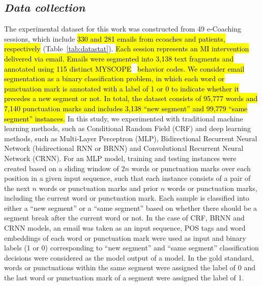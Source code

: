 \documentclass{amia}
\begin{document}
\subsection*{\textit{Data collection}}
The experimental dataset for this work was constructed from 49 e-Coaching sessions, which include \hl{330 and 281 emails from ecoaches and patients, respectively }(Table~\ref{tab:datastat}). \hl{Each session represents an MI intervention delivered via email. Emails were segmented into 3,138 text fragments and annotated using 115 distinct MYSCOPE}~\cite{carcone2013provider} \hl{behavior codes. We consider email segmentation as a binary classification problem, in which each word or punctuation mark is annotated with a label of 1 or 0 to indicate whether it precedes a new segment or not. In total, the dataset consists of 95,777 words and 7,140 punctuation marks and includes 3,138 ``new segment'' and 99,779 ``same segment'' instances.} In this study, we experimented with traditional machine learning methods, such as Conditional Random Field (CRF)\cite{lafferty2001conditional} and deep learning methods, such as Multi-Layer Perceptron (MLP),\cite{rumelhart1986learning} Bidirectional Recurrent Neural Network (bidirectional RNN or BRNN)\cite{schuster1997bidirectional} and Convolutional Recurrent Neural Network (CRNN).\cite{treviso2017sentence} For an MLP model, training and testing instances were created based on a sliding window of $2n$ words or punctuation marks over each position in a given input sequence, such that each instance consists of a pair of the next $n$ words or punctuation marks and prior $n$ words or punctuation marks, including the current word or punctuation mark. Each sample is classified into either a ``new segment'' or a ``same segment'' based on whether there should be a segment break after the current word or not. In the case of CRF, BRNN and CRNN models, an email was taken as an input sequence, POS tags and word embeddings of each word or punctuation mark were used as input and binary labels (1 or 0) corresponding to ``new segment'' and ``same segment'' classification decisions were considered as the model output of a model. In the gold standard, words or punctuations within the same segment were assigned the label of 0 and the last word or punctuation mark of a segment were assigned the label of 1. \\ 
\end{document}
